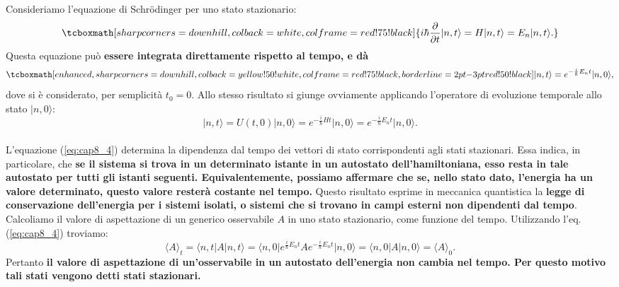 Consideriamo l'equazione di Schr\"{o}dinger per uno stato stazionario:
	\begin{equation}
		\tcboxmath[sharp corners=downhill, colback=white, colframe=red!75!black]{
			i\hbar \frac{\partial}{\partial t}|n,t\rangle = H |n,t \rangle = E_n |n, t \rangle.
			}
	\end{equation}
Questa equazione può \textbf{essere integrata direttamente rispetto al tempo, e dà}
	\begin{equation}
		\tcboxmath[enhanced, sharp corners=downhill, colback=yellow!50!white, colframe=red!75!black, borderline={2pt}{-3pt}{red!50!black}]{	
			|n,t\rangle = e^{-\frac{i}{\hbar}E_n t}\vert n, 0\rangle,
			}
	\label{eq:cap8_4}
	\end{equation}
dove si è considerato, per semplicità $t_0=0$. Allo stesso risultato si giunge ovviamente applicando l'operatore di evoluzione temporale allo stato $\vert n, 0\rangle$:
	\begin{equation}
		\vert n, t \rangle = U(t,0) \vert n, 0 \rangle = e^{-\frac{i}{\hbar}H t}\vert n, 0\rangle= e^{-\frac{i}{\hbar}E_n t}\vert n, 0\rangle.
	\end{equation}\\

L'equazione (\ref{eq:cap8_4}) determina la dipendenza dal tempo dei vettori di stato corrispondenti agli stati stazionari. Essa indica, in particolare, che \textbf{se il sistema si trova in un determinato istante in un autostato dell'hamiltoniana, esso resta in tale autostato per tutti gli istanti seguenti. Equivalentemente, possiamo affermare che se, nello stato dato, l'energia ha un valore determinato, questo valore resterà costante nel tempo.} Questo risultato esprime in meccanica quantistica la \textbf{legge di conservazione dell'energia per i sistemi isolati, o sistemi che si trovano in campi esterni non dipendenti dal tempo}.\\

Calcoliamo il valore di aspettazione di un generico osservabile $A$ in uno stato stazionario, come funzione del tempo. Utilizzando l'eq.(\ref{eq:cap8_4}) troviamo:
	\begin{equation}
		\langle A \rangle _t = \langle n, t \vert A \vert n, t \rangle= \langle n, 0 \vert e^{\frac{i}{\hbar}E_n t}A e^{-\frac{i}{\hbar}E_n t}\vert n, 0 \rangle =\langle n, 0 \vert A \vert n, 0 \rangle = \langle A \rangle _0.
	\end{equation}
Pertanto \textbf{il valore di aspettazione di un'osservabile in un autostato dell'energia non cambia nel tempo. Per questo motivo tali stati vengono detti stati stazionari.}\\

